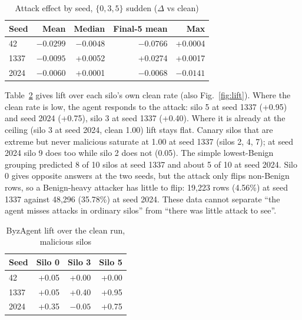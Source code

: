 \begin{table}[h]
\centering
\caption{Attack effect by seed, $\{0,3,5\}$ sudden ($\Delta$ vs clean)} %
\label{tab:portability}
\footnotesize
\begin{tabular}{@{}lrrrr@{}}
\toprule
Seed & Mean & Median & Final-5 mean & Max\\ %
\midrule
42 & $-0.0299$ & $-0.0048$ & $-0.0766$ & +0.0004\\ %
1337 & $-0.0095$ & +0.0052 & +0.0274 & +0.0017\\ %
2024 & $-0.0060$ & +0.0001 & $-0.0068$ & $-0.0141$\\ %
\bottomrule
\end{tabular}
\end{table}

Table~\ref{tab:lift} gives lift over each silo's own clean rate (also Fig.~\ref{fig:lift}).
Where the clean rate is low, the agent responds to the attack: silo 5 at seed 1337 %
(+0.95) and seed 2024 (+0.75), silo 3 at seed 1337 (+0.40). Where it is already at the %
ceiling (silo 3 at seed 2024, clean 1.00) lift stays flat. Canary silos that are extreme %
but never malicious saturate at 1.00 at seed 1337 (silos 2, 4, 7); at seed 2024 silo 9 %
does too while silo 2 does not (0.05). The simple lowest-Benign grouping predicted 8 of %
10 silos at seed 1337 and about 5 of 10 at seed 2024. Silo 0 gives opposite answers at %
the two seeds, but the attack only flips non-Benign rows, so a Benign-heavy attacker has
little to flip: 19,223 rows (4.56\%) at seed 1337 against 48,296 (35.78\%) at seed 2024. %
These data cannot separate ``the agent misses attacks in ordinary silos'' from ``there was
little attack to see''.

\begin{table}[h]
\centering
\caption{ByzAgent lift over the clean run, malicious silos}
\label{tab:lift}
\footnotesize
\begin{tabular}{@{}lrrr@{}}
\toprule
Seed & Silo 0 & Silo 3 & Silo 5\\ %
\midrule
42 & +0.05 & +0.00 & +0.00\\ %
1337 & +0.05 & +0.40 & +0.95\\ %
2024 & +0.35 & $-0.05$ & +0.75\\ %
\bottomrule
\end{tabular}
\end{table}

